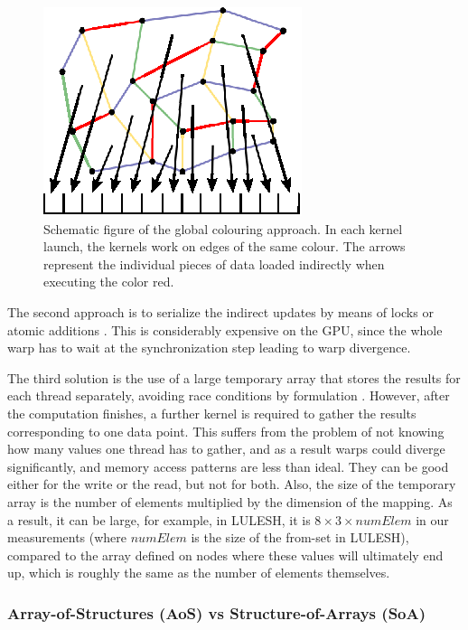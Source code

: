 \begin{figure}[Htpb]
  \centering
  \includegraphics{fig/svg/unstructured_global.eps}
  \caption{Schematic figure of the global colouring approach. In each kernel
  launch, the kernels work on edges of the same colour. The arrows
  represent the individual pieces of data loaded indirectly when executing the color red.}
  \label{fig:unstructured_global}
\end{figure}

The second approach is to serialize the indirect updates by means of locks or
atomic additions \cite{Kraus:2014:ACC:2691158.2691164}. This is considerably 
expensive on the GPU, since the whole warp has to wait at the synchronization 
step leading to warp divergence.

The third solution is the use of a large temporary array that stores the
results for each thread separately, avoiding race conditions by formulation 
\cite{LULESH:spec,miniaero}. However, after the computation finishes, a 
further kernel is required to gather the results corresponding to one data 
point. This suffers from the problem of not knowing how many values one thread 
has to gather, and as a result warps could diverge significantly, and 
memory access patterns are less than ideal. They can be good either for the 
write or the read, but not for both. Also, the size of the temporary array is the 
number of elements multiplied by the dimension of the mapping. As a result, it 
can be large, for example, in LULESH, it is \(8 \times 3 \times numElem \) 
in our measurements (where $numElem$ is the size of the from-set in LULESH), 
compared to the array defined on nodes where these values will ultimately end 
up, which is roughly the same as the number of elements themselves.

\subsubsection{Array-of-Structures (AoS) vs Structure-of-Arrays (SoA)} 
\label{aos-to-soa}

